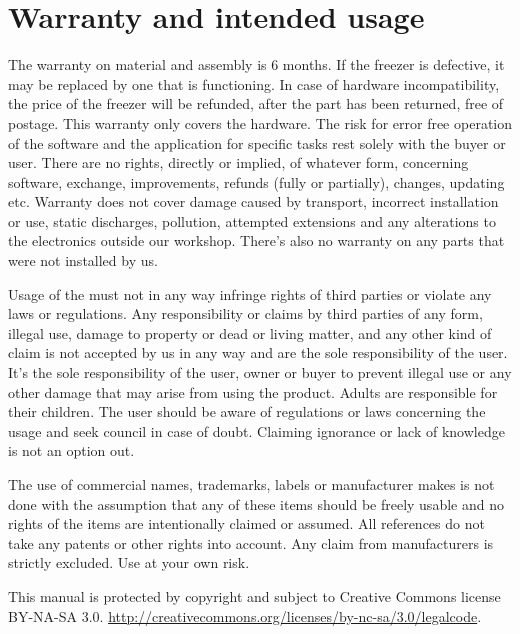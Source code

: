 \makeatletter\@openrightfalse \chapter*{Warranty and intended usage}
\@openrighttrue\makeatother

\thispagestyle{empty}

The warranty on material and assembly is 6 months. If the freezer is defective,
it may be replaced by one that is functioning. In case of hardware
incompatibility, the price of the freezer will be refunded, after the part has
been returned, free of postage. This warranty only covers the hardware. The risk
for error free operation of the software and the application for specific tasks rest solely with the buyer or
user. There are no rights, directly or implied, of whatever form, concerning
software, exchange, improvements, refunds (fully or partially), changes, updating
etc. Warranty does not cover damage caused by transport, incorrect installation
or use, static discharges, pollution, attempted extensions and any alterations to
the electronics outside our workshop. There's also no warranty on any parts that
were not installed by us.

Usage of the \frz must not in any way infringe rights of third parties or
violate any laws or regulations. Any responsibility or claims by third parties
of any form, illegal use, damage to property or dead or living matter, and any
other kind of claim is not accepted by us in any way and are the sole
responsibility of the user. It's the sole responsibility of the user, owner or
buyer to prevent illegal use or any other damage that may arise from using the
product. Adults are responsible for their children. The user should be aware of
regulations or laws concerning the usage and seek council in case of doubt.
Claiming ignorance or lack of knowledge is not an option out.

The use of commercial names, trademarks, labels or manufacturer makes is not
done with the assumption that any of these items should be freely usable and no
rights of the items are intentionally claimed or assumed.
All references do not take any patents or other rights into account.
Any claim from manufacturers is strictly excluded. Use at your own risk.

This manual is protected by copyright and subject to Creative Commons license\linebreak
BY-NA-SA 3.0.\newline
\url{http://creativecommons.org/licenses/by-nc-sa/3.0/legalcode}. 



